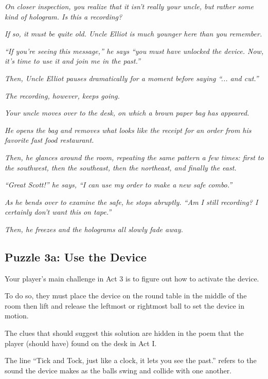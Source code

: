 \documentclass[a6paper, parskip=half, DIV=14, 12pt]{scrartcl}
\begin{document}
\textit{On closer inspection, you realize that it isn't really your uncle, but rather some kind of hologram. Is this a recording?}

\textit{If so, it must be quite old. Uncle Elliot is much younger here than you remember.}

\textit{``If you're seeing this message,'' he says ``you must have unlocked the device. Now, it's time to use it and join me in the past.''}

\textit{Then, Uncle Elliot pauses dramatically for a moment before saying ``... and cut.''}

\newpage

\textit{The recording, however, keeps going.}

\textit{Your uncle moves over to the desk, on which a brown paper bag has appeared.}

\textit{He opens the bag and removes what looks like the receipt for an order from his favorite fast food restaurant.}

\textit{Then, he glances around the room, repeating the same pattern a few times: first to the southwest, then the southeast, then the northeast, and finally the east.}

\textit{``Great Scott!'' he says, ``I can use my order to make a new safe combo.''}

\textit{As he bends over to examine the safe, he stops abruptly. ``Am I still recording? I certainly don't want this on tape.''}

\textit{Then, he freezes and the holograms all slowly fade away.}

\newpage

\subsection*{Puzzle 3a: Use the Device}

Your player's main challenge in Act 3 is to figure out how to activate the device.

To do so, they must place the device on the round table in the middle of the room then lift and release the leftmost or rightmost ball to set the device in motion.

The clues that should suggest this solution are hidden in the poem that the player (should have) found on the desk in Act I. 

The line ``Tick and Tock, just like a clock, it lets you see the past.'' refers to the sound the device makes as the balls swing and collide with one another.
\end{document}
